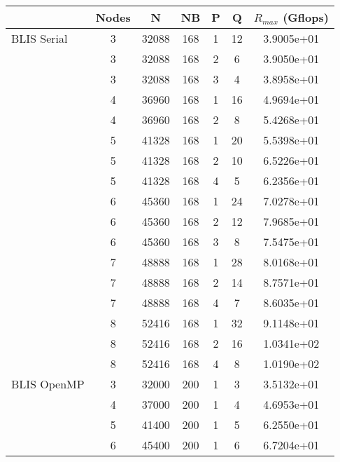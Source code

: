 


\begin{table}
\begin{center}
\begin{tabular}{ |l|c|c|c|c|c|c| } 
\hline
                & Nodes & N & NB & P & Q & $R_{max}$ (Gflops) \\ 
\hline
BLIS Serial     & 3 & 32088 & 168 & 1 & 12 & 3.9005e+01 \\ 
                & 3 & 32088 & 168 & 2 &  6 & 3.9050e+01 \\ 
                & 3 & 32088 & 168 & 3 &  4 & 3.8958e+01 \\ 
                \cline{2-7} 
                & 4 & 36960 & 168 & 1 & 16 & 4.9694e+01 \\ 
                & 4 & 36960 & 168 & 2 &  8 & 5.4268e+01\\ 
                \cline{2-7} 
                & 5 & 41328 & 168 & 1 & 20 & 5.5398e+01 \\ 
                & 5 & 41328 & 168 & 2 & 10 & 6.5226e+01 \\ 
                & 5 & 41328 & 168 & 4 &  5 & 6.2356e+01 \\ 
                \cline{2-7} 
                & 6 & 45360 & 168 & 1 & 24 & 7.0278e+01 \\ 
                & 6 & 45360 & 168 & 2 & 12 & 7.9685e+01 \\ 
                & 6 & 45360 & 168 & 3 &  8 & 7.5475e+01 \\ 
                \cline{2-7} 
                & 7 & 48888 & 168 & 1 & 28 & 8.0168e+01 \\ 
                & 7 & 48888 & 168 & 2 & 14 & 8.7571e+01 \\ 
                & 7 & 48888 & 168 & 4 &  7 & 8.6035e+01 \\ 
                \cline{2-7} 
                & 8 & 52416 & 168 & 1 & 32 & 9.1148e+01 \\ 
                & 8 & 52416 & 168 & 2 & 16 & 1.0341e+02 \\ 
                & 8 & 52416 & 168 & 4 &  8 & 1.0190e+02 \\ 
\hline
BLIS OpenMP     & 3 & 32000 & 200 & 1 & 3 & 3.5132e+01 \\ 
                \cline{2-7} 
                & 4 & 37000 & 200 & 1 & 4 & 4.6953e+01 \\ 
                \cline{2-7} 
                & 5 & 41400 & 200 & 1 & 5 & 6.2550e+01 \\ 
                \cline{2-7} 
                & 6 & 45400 & 200 & 1 & 6 & 6.7204e+01 \\ 

\end{tabular}
\end{center}
\end{table}
